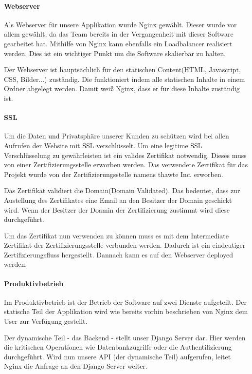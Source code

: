 \paragraph{Webserver}
Als Webserver für unsere Applikation wurde Nginx gewählt. Dieser wurde vor allem gewählt, da das Team bereits in der Vergangenheit mit dieser Software gearbeitet hat. Mithilfe von Nginx kann ebenfalls ein Loadbalancer realisiert werden. Dies ist ein wichtiger Punkt um die Software skalierbar zu halten. \\


Der Webserver ist hauptsächlich für den statischen Content(HTML, Javascript, CSS, Bilder...) zuständig. Die funktioniert indem alle statischen Inhalte in einem Ordner abgelegt werden. Damit weiß Nginx, dass er für diese Inhalte zuständig ist.

\paragraph{SSL}
Um die Daten und Privatsphäre unserer Kunden zu schützen wird bei allen Aufrufen der Website mit \gls{SSL} verschlüsselt. Um eine legitime SSL Verschlüsselung zu gewährleisten ist ein valides Zertifikat notwendig. Dieses muss von einer Zertifizierungsstelle erworben werden. Das verwendete Zertifikat für das Projekt wurde von der Zertifizierungsstelle namens thawte Inc. erworben. 

Das Zertifikat validiert die Domain(Domain Validated). Das bedeutet, dass zur Austellung des Zertifikates eine Email an den Besitzer der Domain geschickt wird. Wenn der Besitzer der Doamin der Zertifizierung zustimmt wird diese durchgeführt. 

Um das Zertifikat nun verwenden zu können muss es mit dem Intermediate Zertifikat der Zertifizierungsstelle verbunden werden. Dadurch ist ein eindeutiger Zertifizierungsfluss hergestellt. Dannach kann es auf den Webserver deployed werden.
   
\paragraph{Produktivbetrieb}
Im Produktivbetrieb ist der Betrieb der Software auf zwei Dienste aufgeteilt. Der statische Teil der Applikation wird wie bereits vorhin beschrieben von Nginx dem User zur Verfügung gestellt. 

Der dynamische Teil - das Backend - stellt unser Django Server dar. Hier werden die kritischen Operationen wie Datenbankzugriffe oder die Authentifizierung durchgeführt. Wird nun unsere \gls{API} (der dynamische Teil) aufgerufen, leitet Nginx die Anfrage an den Django Server weiter. \\

